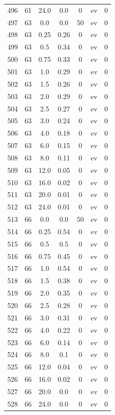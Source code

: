 \documentclass[12pt,a4paper]{article}
\begin{document}
\begin{tabular}{r|cccccc}
	496 & 61 & 24.0 & 0.0 & 0 & ev & 0 \\
	497 & 63 & 0.0 & 0.0 & 50 & ev & 0 \\
	498 & 63 & 0.25 & 0.26 & 0 & ev & 0 \\
	499 & 63 & 0.5 & 0.34 & 0 & ev & 0 \\
	500 & 63 & 0.75 & 0.33 & 0 & ev & 0 \\
	501 & 63 & 1.0 & 0.29 & 0 & ev & 0 \\
	502 & 63 & 1.5 & 0.26 & 0 & ev & 0 \\
	503 & 63 & 2.0 & 0.29 & 0 & ev & 0 \\
	504 & 63 & 2.5 & 0.27 & 0 & ev & 0 \\
	505 & 63 & 3.0 & 0.24 & 0 & ev & 0 \\
	506 & 63 & 4.0 & 0.18 & 0 & ev & 0 \\
	507 & 63 & 6.0 & 0.15 & 0 & ev & 0 \\
	508 & 63 & 8.0 & 0.11 & 0 & ev & 0 \\
	509 & 63 & 12.0 & 0.05 & 0 & ev & 0 \\
	510 & 63 & 16.0 & 0.02 & 0 & ev & 0 \\
	511 & 63 & 20.0 & 0.01 & 0 & ev & 0 \\
	512 & 63 & 24.0 & 0.01 & 0 & ev & 0 \\
	513 & 66 & 0.0 & 0.0 & 50 & ev & 0 \\
	514 & 66 & 0.25 & 0.54 & 0 & ev & 0 \\
	515 & 66 & 0.5 & 0.5 & 0 & ev & 0 \\
	516 & 66 & 0.75 & 0.45 & 0 & ev & 0 \\
	517 & 66 & 1.0 & 0.54 & 0 & ev & 0 \\
	518 & 66 & 1.5 & 0.38 & 0 & ev & 0 \\
	519 & 66 & 2.0 & 0.35 & 0 & ev & 0 \\
	520 & 66 & 2.5 & 0.28 & 0 & ev & 0 \\
	521 & 66 & 3.0 & 0.31 & 0 & ev & 0 \\
	522 & 66 & 4.0 & 0.22 & 0 & ev & 0 \\
	523 & 66 & 6.0 & 0.14 & 0 & ev & 0 \\
	524 & 66 & 8.0 & 0.1 & 0 & ev & 0 \\
	525 & 66 & 12.0 & 0.04 & 0 & ev & 0 \\
	526 & 66 & 16.0 & 0.02 & 0 & ev & 0 \\
	527 & 66 & 20.0 & 0.0 & 0 & ev & 0 \\
	528 & 66 & 24.0 & 0.0 & 0 & ev & 0 \\

\end{tabular}
\end{document}

